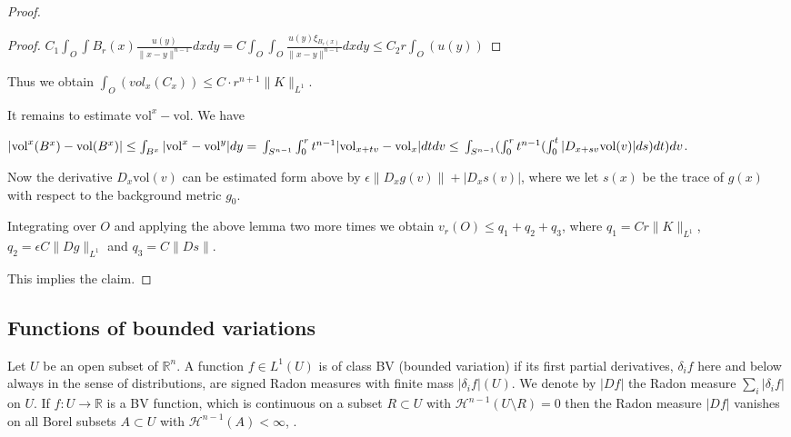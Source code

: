 \documentclass[12pt,leqno]{amsart}
\numberwithin{equation}{section}
\theoremstyle{definition}
\theoremstyle{remark}
\newtheorem{rem}[thm]{Remark}
\newcommand{\vol}{\mathrm{vol}}
\newcommand{\R}{\mathbb{R}}
\begin{document}
\begin{proof}
\begin{proof}
     $C_1 \int _O \int B_r (x) \frac {u(y)}  {\|x-y\| ^{n-1}} dx dy = C \int _O \int _O \frac {u(y) \xi _{B_r (x)}}
     {\|x-y\| ^{n-1}} dx dy \leq C_2 r  \int _O (u(y))$
     \end{proof}


      Thus we obtain $\int _O (vol _x (C_x)) \leq C \cdot r^{n+1} \|K\| _{L^1}$.


      It remains to estimate $\vol ^x - \vol$. We have

      $|\vol ^x (B^x) -\vol (B^x)| \leq \int _ {B^x} |\vol ^x -\vol ^y| dy = \\
      \int _{S^{n-1}} \int _0 ^r  t^{n-1} | \vol _{x+tv} - \vol _x| dt dv \leq  \\
       \int _{ S^{n-1}} (\int _0 ^r t^{n-1} (\int _0 ^t  |D_{x+sv} \vol (v)| ds) dt) dv$.

      Now the derivative $D_x \vol (v)$ can be estimated form above by $\epsilon \|D_xg (v)\| + | D_x s (v)|$,
      where we let $s(x)$ be the trace of $g(x)$ with respect to the background metric $g_0$.

      Integrating over $O$ and applying the above lemma two more times we obtain
      $v_r (O) \leq q_1 +q_2 +q_3$, where
      $q_1 = C r \|K\| _{L^1}$, $q_2 = \epsilon C \| Dg\| _{L^1} $ and $q_3 = C \|Ds\|$.

      This implies the claim.
    \end{proof}



\subsection{Functions of bounded variations}
Let $U$ be an open subset of $\R^n$. A function $f\in L^1 (U)$ is of class  BV (bounded variation) if its first partial derivatives, $\delta _i f$ here and below always in the sense of distributions, are signed Radon measures with finite mass $|\delta _i f |(U)$. We denote by $|Df|$ the Radon measure $\sum_i |\delta _i f|$ on $U$.  If $f:U\to \R$ is a BV function, which is continuous on a subset $R \subset U$ with $\mathcal H^{n-1} (U\setminus R)=0$ then the Radon measure $|Df|$ vanishes on all Borel subsets $A\subset U$ with $\mathcal H^{n-1} (A)<\infty$, \cite{Goffmann}.
\end{document}
